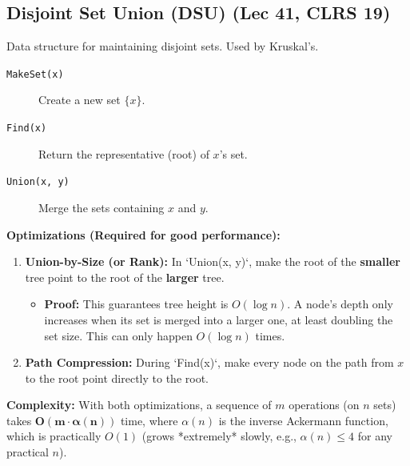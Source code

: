 \subsection{Disjoint Set Union (DSU) (Lec 41, CLRS 19)}
Data structure for maintaining disjoint sets. Used by Kruskal's.
\begin{description}
    \item[\texttt{MakeSet(x)}] Create a new set $\{x\}$.
    \item[\texttt{Find(x)}] Return the representative (root) of $x$'s set.
    \item[\texttt{Union(x, y)}] Merge the sets containing $x$ and $y$.
\end{description}
\textbf{Optimizations (Required for good performance):}
\begin{enumerate}
    \item \textbf{Union-by-Size (or Rank):} In `Union(x, y)`, make the root of the \textbf{smaller} tree point to the root of the \textbf{larger} tree.
    \begin{itemize}
        \item \textbf{Proof:} This guarantees tree height is $O(\log n)$. A node's depth only increases when its set is merged into a larger one, at least doubling the set size. This can only happen $O(\log n)$ times.
    \end{itemize}
    \item \textbf{Path Compression:} During `Find(x)`, make every node on the path from $x$ to the root point directly to the root.
\end{enumerate}
\textbf{Complexity:} With both optimizations, a sequence of $m$ operations (on $n$ sets) takes $\mathbf{O(m \cdot \alpha(n))}$ time, where $\alpha(n)$ is the inverse Ackermann function, which is practically $O(1)$ (grows *extremely* slowly, e.g., $\alpha(n) \le 4$ for any practical $n$).